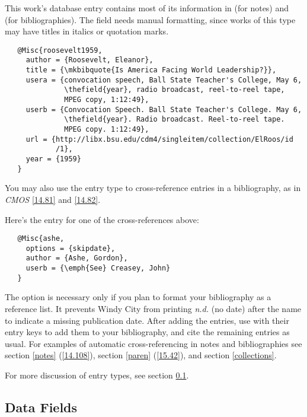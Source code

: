 \documentclass[11pt,letterpaper,oneside]{article}
\begin{document}
\noindent This work's database entry contains most of its information
in  (for notes) and  (for
bibliographies). The  field needs manual formatting,
since works of this type may have titles in italics or quotation
marks.

\begin{verbatim}
   @Misc{roosevelt1959,
     author = {Roosevelt, Eleanor},
     title = {\mkbibquote{Is America Facing World Leadership?}},
     usera = {convocation speech, Ball State Teacher's College, May 6,
              \thefield{year}, radio broadcast, reel-to-reel tape,
              MPEG copy, 1:12:49},
     userb = {Convocation Speech. Ball State Teacher's College. May 6,
              \thefield{year}. Radio broadcast. Reel-to-reel tape.
              MPEG copy. 1:12:49},
     url = {http://libx.bsu.edu/cdm4/singleitem/collection/ElRoos/id
            /1},
     year = {1959}
   }
\end{verbatim}

You may also use the  entry type to cross-reference
entries in a bibliography, as in \textit{CMOS} \ref{14.81} and
\ref{14.82}.

\begin{bibonly}
\nocite{ashe,creasey1976,creasey1978,creasey1966,morton,york}
\end{bibonly}

\noindent Here's the  entry for one of the
cross-references above:

\begin{verbatim}
   @Misc{ashe,
     options = {skipdate},
     author = {Ashe, Gordon},
     userb = {\emph{See} Creasey, John}
   }
\end{verbatim}

\noindent The option  is necessary only if you plan to
format your bibliography as a reference list. It prevents Windy City
from printing \textit{n.d.} (no date) after the name to indicate a
missing publication date. After adding the  entries, use
 with their entry keys to add them to your bibliography,
and cite the remaining entries as usual. For examples of automatic
cross-referencing in notes and bibliographies see section \ref{notes}
(\ref{14.108}), section \ref{paren} (\ref{15.42}), and section
\ref{collections}.

For more discussion of entry types, see section \ref{datafields}.

\subsection{Data Fields}
\label{datafields}
\end{document}
